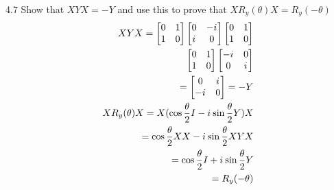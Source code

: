 \documentclass[12pt, letterpaper, twoside]{article}
\newcommand{\iu}{{i\mkern1mu}}
\newcommand{\halftheta}{\frac{\theta}{2}}
\newcommand{\twoXtwo}[4]{\begin{bmatrix}
    #1 & #3 \\
    #2 & #4
\end{bmatrix}}
\newcommand{\pauliX}{\twoXtwo{0}{1}{1}{0}}
\newcommand{\pauliY}{\twoXtwo{0}{\iu}{-\iu}{0}}
\begin{document}
4.7 Show that $XYX = -Y$ and use this to prove that $X R_y(\theta)X = R_y(-\theta)$
\begin{subequations}
\begin{align}
XYX = \pauliX\pauliY\pauliX\\
\pauliX\twoXtwo{-\iu}{0}{0}{\iu}\\
= \twoXtwo{0}{-\iu}{\iu}{0} = -Y\\
XR_y(\theta)X = X(\cos{\halftheta}I - \iu \sin{\halftheta}Y)X\\
= \cos{\halftheta}XX - \iu \sin{\halftheta}XYX\\
= \cos{\halftheta}I +\iu \sin{\halftheta}Y\\
= R_y(-\theta)
\end{align}
\end{subequations}
\end{document}
